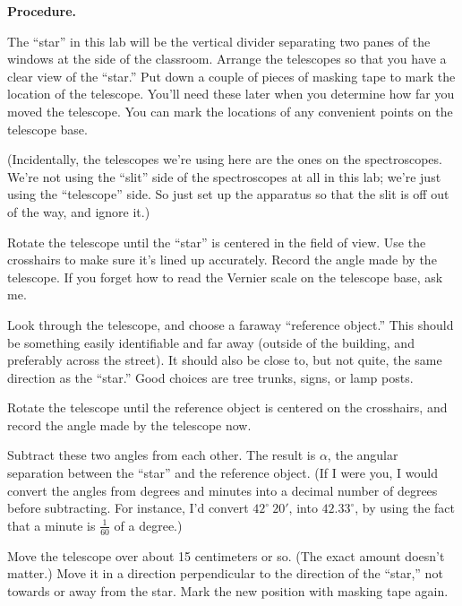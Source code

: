 \bigskip

{\bf Procedure.}

The ``star'' in this lab will be the vertical divider separating
two panes of the windows at the side of the classroom.  Arrange
the telescopes so that you have a clear view of the ``star.''
Put down a couple of pieces of masking tape to mark the location
of the telescope.  You'll need these later when you determine
how far you moved the telescope.  You can mark the locations
of any convenient points on the telescope base.

(Incidentally, the telescopes we're using here are the ones on the
spectroscopes.  We're not using the ``slit'' side of the spectroscopes
at all in this lab; we're just using the ``telescope'' side.  So 
just set up the apparatus so that the slit is off out of the way, and
ignore it.)

Rotate the telescope until the ``star'' is centered in the field of view.
Use the crosshairs to make sure it's lined up accurately.
Record the angle made by the telescope.  If you forget how to read
the Vernier scale on the telescope base, ask me.

\answerspace{1in}

Look through the telescope, and choose a faraway ``reference object.''
This should be something easily identifiable and far away (outside
of the building, and preferably across the street).  It should also
be close to, but not quite, the same direction as the ``star.''
Good choices are tree trunks, signs, or lamp posts.

Rotate the telescope until the reference object is centered on the crosshairs,
and record the angle made by the telescope now.

\answerspace{1in}

Subtract these two angles from each other.  The result is $\alpha$,
the angular separation between the ``star'' and the reference
object.  (If I were you, I would convert the angles from degrees
and minutes into a decimal number of degrees before subtracting.
For instance, I'd convert $42^\circ\ 20'$, into $42.33^\circ$,
by using the fact that a minute is $\frac{1}{60}$ of a degree.)

\answerspace{1in}

Move the telescope over about 15 centimeters or so.  (The exact amount
doesn't matter.)  Move it in a direction perpendicular to the direction
of the ``star,'' not towards or away from the star.
Mark the new position with masking tape again.

